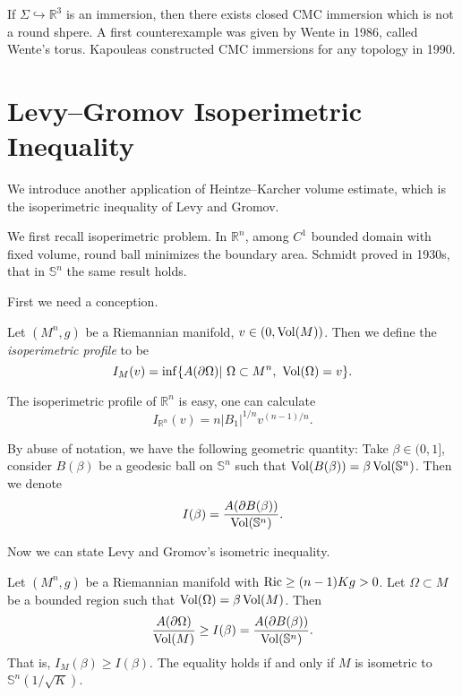 \begin{rem}
    If $\Sigma\hookrightarrow\mathbb{R}^3$ is an immersion, then there exists closed CMC immersion which is not a round shpere.
    A first counterexample was given by Wente in 1986, called Wente's torus.
    Kapouleas constructed CMC immersions for any topology in 1990.
\end{rem}

\section{Levy--Gromov Isoperimetric Inequality}

We introduce another application of Heintze--Karcher volume estimate, which is the isoperimetric inequality of Levy and Gromov.

We first recall isoperimetric problem.
In $\mathbb{R}^n$, among $C^1$ bounded domain with fixed volume, round ball minimizes the boundary area.
Schmidt proved in 1930s, that in $\mathbb{S}^n$ the same result holds.

First we need a conception.
\begin{defn}
    Let $(M^n,g)$ be a Riemannian manifold, $v\in(0,\operatorname{Vol}(M))$.
    Then we define the \emph{isoperimetric profile} to be
    \[I_M(v)=\inf\{A(\partial\Omega)|\ \Omega\subset M^n,\ \operatorname{Vol}(\Omega)=v\}.\]
\end{defn}
\begin{eg}
    The isoperimetric profile of $\mathbb{R}^n$ is easy, one can calculate
    \[I_{\mathbb{R}^n}(v)=n|B_1|^{1/n}v^{(n-1)/n}.\]
\end{eg}

By abuse of notation, we have the following geometric quantity:
Take $\beta\in(0,1]$, consider $B(\beta)$ be a geodesic ball on $\mathbb{S}^n$ such that $\operatorname{Vol}(B(\beta))=\beta\operatorname{Vol}(\mathbb{S}^n)$.
Then we denote
\[I(\beta)=\frac{A(\partial B(\beta))}{\operatorname{Vol}(\mathbb{S}^n)}.\]

Now we can state Levy and Gromov's isometric inequality.
\begin{thm}\label{Levy Gromov}
    Let $(M^n,g)$ be a Riemannian manifold with $\operatorname{Ric}\geq(n-1)Kg>0$.
    Let $\Omega\subset M$ be a bounded region such that $\operatorname{Vol}(\Omega)=\beta\operatorname{Vol}(M)$.
    Then
    \[\frac{A(\partial\Omega)}{\operatorname{Vol}(M)}\geq I(\beta)=\frac{A(\partial B(\beta))}{\operatorname{Vol}(\mathbb{S}^n)}.\]
    That is, $I_M(\beta)\geq I(\beta)$.
    The equality holds if and only if $M$ is isometric to $\mathbb{S}^n(1/\sqrt{K})$.
\end{thm}

